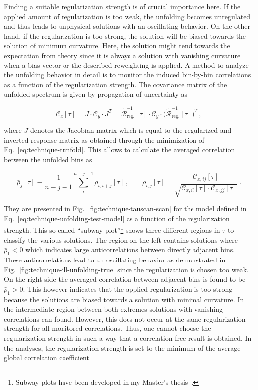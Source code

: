 Finding a suitable regularization strength is of crucial importance here. If the applied amount of regularization is too weak, the unfolding becomes unregulated and thus leads to unphysical solutions with an oscillating behavior. On the other hand, if the regularization is too strong, the solution will be biased towards the solution of minimum curvature. Here, the solution might tend towards the expectation from theory since it is always a solution with vanishing curvature when a bias vector or the described reweighting is applied. A method to analyze the unfolding behavior in detail is to monitor the induced bin-by-bin correlations as a function of the regularization strength. The covariance matrix of the unfolded spectrum is given by propagation of uncertainty as

\begin{equation}
\mathcal{C}_{x}[\tau]=J\cdot\mathcal{C}_{y}\cdot J^{T}=\tilde{\mathcal{R}}^{-1}_\mathrm{reg.}[\tau]\cdot\mathcal{C}_{y}\cdot\big(\tilde{\mathcal{R}}^{-1}_\mathrm{reg.}[\tau]\big)^{T}\,,
\end{equation}

where $J$ denotes the Jacobian matrix which is equal to the regularized and inverted response matrix as obtained through the minimization of Eq.~\ref{eq:technique-tunfold}. This allows to calculate the averaged correlation between the unfolded bins as

\begin{equation}
\bar{\rho}_{j}[\tau]\equiv\frac{1}{n-j-1}\sum_{i}^{n-j-1}\rho_{i,i+j}[\tau]\,,\qquad \rho_{i,j}[\tau]=\frac{\mathcal{C}_{x,ij}[\tau]}{\sqrt{\mathcal{C}_{x,ii}[\tau]\cdot\mathcal{C}_{x,jj}[\tau]}}\,.\label{eq:technique-avg-correlation}
\end{equation}

They are presented in Fig.~\ref{fig:technique-tauscan-scan} for the model defined in Eq.~\ref{eq:technique-unfolding-test-model} as a function of the regularization strength. This so-called ``subway plot''\footnote{Subway plots have been developed in my Master's thesis~\cite{Komm-thesis}.} shows three different regions in $\tau$ to classify the various solutions. The region on the left contains solutions where $\bar{\rho}_{1}<0$ which indicates large anticorrelations between directly adjacent bins. These anticorrelations lead to an oscillating behavior as demonstrated in Fig.~\ref{fig:technique-ill-unfolding-true} since the regularization is chosen too weak. On the right side the averaged correlation between adjacent bins is found to be $\bar{\rho}_{1}>0$. This however indicates that the applied regularization is too strong because the solutions are biased towards a solution with minimal curvature. In the intermediate region between both extremes solutions with vanishing correlations can found. However, this does not occur at the same regularization strength for all monitored correlations. Thus, one cannot choose the regularization strength in such a way that a correlation-free result is obtained. In the analyses, the regularization strength is set to the minimum of the average global correlation coefficient


